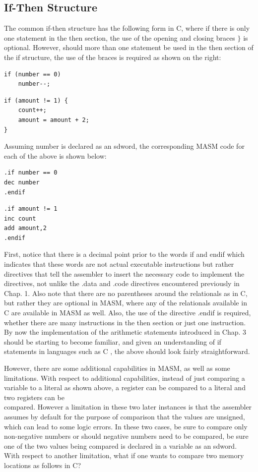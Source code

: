 \documentclass[10pt]{article}
\begin{document}
\subsection*{If-Then Structure}
The common if-then structure has the following form in C, where if there is only one statement in the then section, the use of the opening and closing braces $\}$ is optional. However, should more than one statement be used in the then section of the if structure, the use of the braces is required as shown on the right:

\begin{verbatim}
if (number == 0)
    number--;
\end{verbatim}

\begin{verbatim}
if (amount != 1) {
    count++;
    amount = amount + 2;
}
\end{verbatim}

Assuming number is declared as an sdword, the corresponding MASM code for each of the above is shown below:

\begin{verbatim}
.if number == 0
dec number
.endif
\end{verbatim}

\begin{verbatim}
.if amount != 1
inc count
add amount,2
.endif
\end{verbatim}

First, notice that there is a decimal point prior to the words if and endif which indicates that these words are not actual executable instructions but rather directives that tell the assembler to insert the necessary code to implement the directives, not unlike the .data and .code directives encountered previously in Chap. 1. Also note that there are no parentheses around the relationals as in C, but rather they are optional in MASM, where any of the relationals available in C are available in MASM as well. Also, the use of the directive .endif is required, whether there are many instructions in the then section or just one instruction. By now the implementation of the arithmetic statements introduced in Chap. 3 should be starting to become familiar, and given an understanding of if statements in languages such as C , the above should look fairly straightforward.

However, there are some additional capabilities in MASM, as well as some limitations. With respect to additional capabilities, instead of just comparing a variable to a literal as shown above, a register can be compared to a literal and two registers can be\\
compared. However a limitation in these two later instances is that the assembler assumes by default for the purpose of comparison that the values are unsigned, which can lead to some logic errors. In these two cases, be sure to compare only non-negative numbers or should negative numbers need to be compared, be sure one of the two values being compared is declared in a variable as an sdword. With respect to another limitation, what if one wants to compare two memory locations as follows in C?
\end{document}
